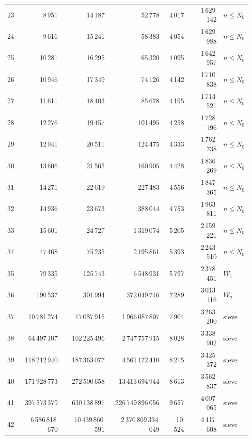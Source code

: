 \documentclass[11pt]{amsart}
\theoremstyle{definition}
\theoremstyle{remark}
\begin{document}
\begin{center}
\begin{tabular}{@{}rrrrrrl@{}}
23 & 8\,951 & 14\,187 & 52\,778 & 4\,017 & 1\,629\,142 & $n\le N_0$ \\
24 & 9\,616 & 15\,241 & 58\,383 & 4\,054 & 1\,629\,988 & $n\le N_0$ \\
25 & 10\,281 & 16\,295 & 65\,320 & 4\,095 & 1\,642\,957 & $n\le N_0$ \\
26 & 10\,946 & 17\,349 & 74\,126 & 4\,142 & 1\,710\,838 & $n\le N_0$ \\
27 & 11\,611 & 18\,403 & 85\,678 & 4\,195 & 1\,714\,521 & $n\le N_0$ \\
28 & 12\,276 & 19\,457 & 101\,495 & 4\,258 & 1\,728\,196 & $n\le N_0$ \\
29 & 12\,941 & 20\,511 & 124\,475 & 4\,333 & 1\,762\,738 & $n\le N_0$ \\
30 & 13\,606 & 21\,565 & 160\,905 & 4\,428 & 1\,836\,269 & $n\le N_0$ \\
31 & 14\,271 & 22\,619 & 227\,483 & 4\,556 & 1\,847\,365 & $n\le N_0$ \\
32 & 14\,936 & 23\,673 & 388\,044 & 4\,753 & 1\,963\,811 & $n\le N_0$ \\
33 & 15\,601 & 24\,727 & 1\,319\,074 & 5\,205 & 2\,159\,221 & $n\le N_0$ \\
34 & 47\,468 & 75\,235 & 2\,195\,861 & 5\,393 & 2\,243\,510 & $n\le N_0$ \\
35 & 79\,335 & 125\,743 & 6\,548\,931 & 5\,797 & 2\,378\,451 & $W_1$ \\
36 & 190\,537 & 301\,994 & 372\,049\,746 & 7\,289 & 3\,013\,116 & $W_2$ \\
37 & 10\,781\,274 & 17\,087\,915 & 1\,966\,087\,807 & 7\,904 & 3\,263\,200 & sieve \\
38 & 64\,497\,107 & 102\,225\,496 & 2\,747\,757\,915 & 8\,028 & 3\,338\,902 & sieve \\
39 & 118\,212\,940 & 187\,363\,077 & 4\,561\,172\,410 & 8\,215 & 3\,425\,372 & sieve \\
40 & 171\,928\,773 & 272\,500\,658 & 13\,413\,694\,944 & 8\,613 & 3\,562\,837 & sieve \\
41 & 397\,573\,379 & 630\,138\,897 & 226\,749\,896\,056 & 9\,657 & 4\,007\,065 & sieve \\
42 & 6\,586\,818\,670 & 10\,439\,860\,591 & 2\,370\,809\,334\,049 & 10\,524 & 4\,417\,608 & sieve \\
\bottomrule
\end{tabular}
\end{center}
\end{document}
